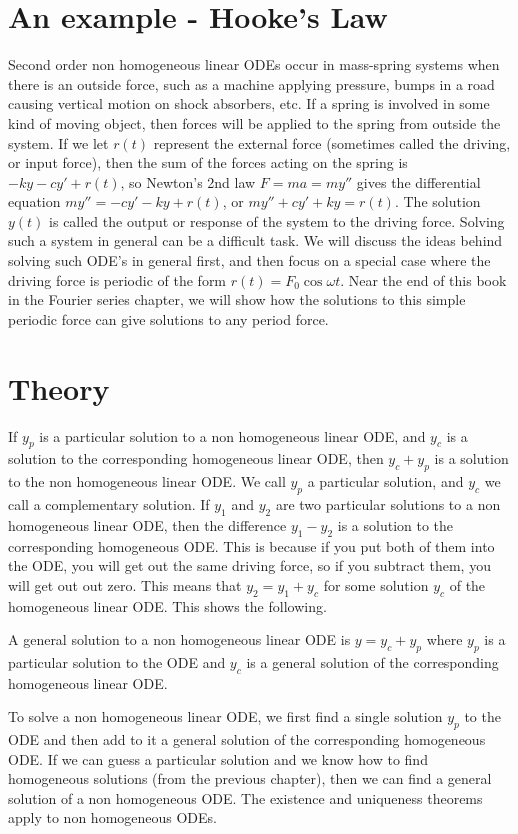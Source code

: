 \section{An example - Hooke's Law}
Second order non homogeneous linear ODEs occur in mass-spring systems when there is an outside force, such as a machine applying pressure, bumps in a road causing vertical motion on shock absorbers, etc. If a spring is involved in some kind of moving object, then forces will be applied to the spring from outside the system. If we let $r(t)$ represent the external force (sometimes called the driving, or input force), then the sum of the forces acting on the spring is $-ky-cy'+r(t)$, so Newton's 2nd law $F=ma = my''$ gives the differential equation $my''=-cy'-ky+r(t)$, or $my''+cy'+ky=r(t)$.  The solution $y(t)$ is called the output or response of the system to the driving force.  Solving such a system in general can be a difficult task.  We will discuss the ideas behind solving such ODE's in general first, and then focus on a special case where the driving force is periodic of the form $r(t)=F_0\cos \omega t$. Near the end of this book in the Fourier series chapter, we will show how the solutions to this simple periodic force can give solutions to any period force. 

\section{Theory}
If $y_p$ is a particular solution to a non homogeneous linear ODE, and $y_c$ is a solution to the corresponding homogeneous linear ODE, then $y_c+y_p$ is a solution to the non homogeneous linear ODE. We call $y_p$ a particular solution, and $y_c$ we call a complementary solution. If $y_1$ and $y_2$ are two particular solutions to a non homogeneous linear ODE, then the difference $y_1-y_2$ is a solution to the corresponding homogeneous ODE. This is because if you put both of them into the ODE, you will get out the same driving force, so if you subtract them, you will get out out zero. This means that $y_2=y_1+y_c$ for some solution $y_c$ of the homogeneous linear ODE. This shows the following.
\begin{theorem}
A general solution to a non homogeneous linear ODE is $y=y_c+y_p$ where $y_p$ is a particular solution to the ODE and $y_c$ is a general solution of the corresponding homogeneous linear ODE. 
\end{theorem}
To solve a non homogeneous linear ODE, we first find a single solution $y_p$ to the ODE and then add to it a general solution of the corresponding homogeneous ODE. If we can guess a particular solution and we know how to find homogeneous solutions (from the previous chapter), then we can find a general solution of a non homogeneous ODE. The existence and uniqueness theorems apply to non homogeneous ODEs.

